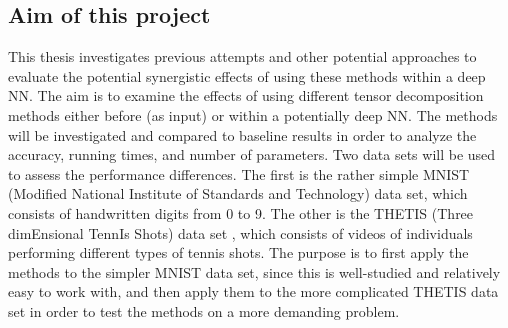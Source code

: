 \subsection{Aim of this project}
This thesis investigates previous attempts and other potential approaches to evaluate the potential synergistic effects of using these methods within a deep NN. The aim is to examine the effects of using different tensor decomposition methods either before (as input) or within a potentially deep NN. The methods will be investigated and compared to baseline results in order to analyze the accuracy, running times, and number of parameters. Two data sets will be used to assess the performance differences. The first is the rather simple MNIST (Modified National Institute of Standards and Technology) data set\cite{MNIST}, which consists of handwritten digits from 0 to 9. The other is the THETIS (Three dimEnsional TennIs Shots) data set \cite{Gourgari2013}, which consists of videos of individuals performing different types of tennis shots. The purpose is to first apply the methods to the simpler MNIST data set, since this is well-studied and relatively easy to work with, and then apply them to the more complicated THETIS data set in order to test the methods on a more demanding problem.